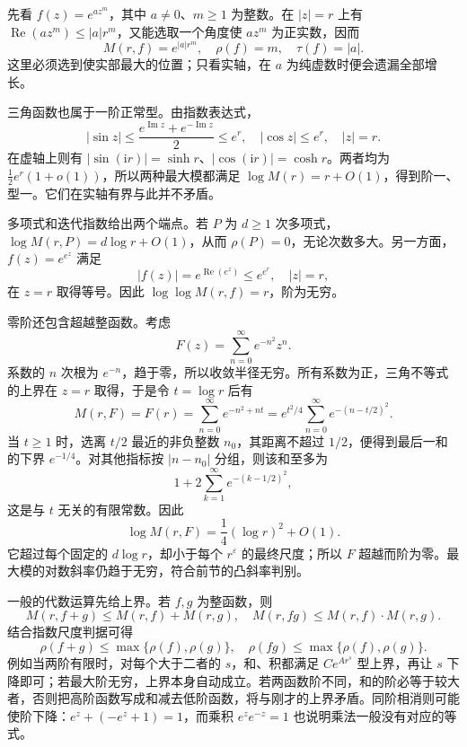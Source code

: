 先看 \(f(z)=e^{az^m}\)，其中 \(a\ne0\)、\(m\ge1\) 为整数。在 \(|z|=r\) 上有 \(\operatorname{Re}(az^m)\le|a|r^m\)，又能选取一个角度使 \(az^m\) 为正实数，因而
\[
 M(r,f)=e^{|a|r^m},\quad \rho(f)=m,\quad \tau(f)=|a|.
\]
这里必须选到使实部最大的位置；只看实轴，在 \(a\) 为纯虚数时便会遗漏全部增长。

\ProseParagraphBreak

三角函数也属于一阶正常型。由指数表达式，
\[
 |\sin z|\le\frac{e^{\operatorname{Im}z}+e^{-\operatorname{Im}z}}2\le e^r,
 \quad
 |\cos z|\le e^r,\quad |z|=r.
\]
在虚轴上则有 \(|\sin(\mathrm{i}r)|=\sinh r\)、\(|\cos(\mathrm{i}r)|=\cosh r\)。两者均为 \(\tfrac12e^r(1+o(1))\)，所以两种最大模都满足 \(\log M(r)=r+O(1)\)，得到阶一、型一。它们在实轴有界与此并不矛盾。

\ProseParagraphBreak

多项式和迭代指数给出两个端点。若 \(P\) 为 \(d\ge1\) 次多项式，\(\log M(r,P)=d\log r+O(1)\)，从而 \(\rho(P)=0\)，无论次数多大。另一方面，\(f(z)=e^{e^z}\) 满足
\[
 |f(z)|=e^{\operatorname{Re}(e^z)}\le e^{e^r},\quad |z|=r,
\]
在 \(z=r\) 取得等号。因此 \(\log\log M(r,f)=r\)，阶为无穷。

\ProseParagraphBreak

零阶还包含超越整函数。考虑
\[
 F(z)=\sum_{n=0}^{\infty}e^{-n^2}z^n.
\]
系数的 \(n\) 次根为 \(e^{-n}\)，趋于零，所以收敛半径无穷。所有系数为正，三角不等式的上界在 \(z=r\) 取得，于是令 \(t=\log r\) 后有
\[
 M(r,F)=F(r)
 =\sum_{n=0}^{\infty}e^{-n^2+nt}
 =e^{t^2/4}\sum_{n=0}^{\infty}e^{-(n-t/2)^2}.
\]
当 \(t\ge1\) 时，选离 \(t/2\) 最近的非负整数 \(n_0\)，其距离不超过 \(1/2\)，便得到最后一和的下界 \(e^{-1/4}\)。对其他指标按 \(|n-n_0|\) 分组，则该和至多为
\[
 1+2\sum_{k=1}^{\infty}e^{-(k-1/2)^2},
\]
这是与 \(t\) 无关的有限常数。因此
\[
 \log M(r,F)=\frac14(\log r)^2+O(1).
\]
它超过每个固定的 \(d\log r\)，却小于每个 \(r^\varepsilon\) 的最终尺度；所以 \(F\) 超越而阶为零。最大模的对数斜率仍趋于无穷，符合前节的凸斜率判别。

\ProseParagraphBreak

一般的代数运算先给上界。若 \(f,g\) 为整函数，则
\[
 M(r,f+g)\le M(r,f)+M(r,g),\quad
 M(r,fg)\le M(r,f)\cdot M(r,g).
\]
结合指数尺度判据可得
\[
 \rho(f+g)\le\max\{\rho(f),\rho(g)\},\quad
 \rho(fg)\le\max\{\rho(f),\rho(g)\}.
\]
例如当两阶有限时，对每个大于二者的 \(s\)，和、积都满足 \(C e^{A r^s}\) 型上界，再让 \(s\) 下降即可；若最大阶无穷，上界本身自动成立。若两函数阶不同，和的阶必等于较大者，否则把高阶函数写成和减去低阶函数，将与刚才的上界矛盾。同阶相消则可能使阶下降：\(e^z+(-e^z+1)=1\)，而乘积 \(e^ze^{-z}=1\) 也说明乘法一般没有对应的等式。

